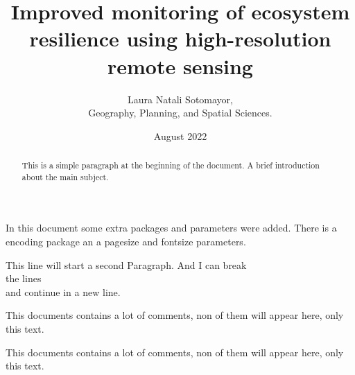 \documentclass[12pt, letterpaper, twoside]{article}
\title{Improved monitoring of ecosystem resilience using high-resolution remote sensing }
\author{Laura Natali Sotomayor, \\
Geography, Planning, and Spatial Sciences.}
\date{August 2022}
\begin{document}
\begin{titlepage}
\maketitle
\end{titlepage}

\begin{abstract}
This is a simple paragraph at the beginning of the 
document. A brief introduction about the main subject.
\end{abstract}

In this document some extra packages and parameters
were added. There is a encoding package
an a pagesize and fontsize parameters.

This line will start a second Paragraph. And I can break\\ the lines \\
and continue in a new line.

This documents contains a lot of comments, non of them
will appear here, only this text.

This documents contains a lot of comments, non of them
will appear here, only this text.

\begin{comment}
This text won't show up in the compiled pdf
this is just a multi-line comment. Useful
to, for instance, comment out slow-rendering
while working on the draft.
\end{comment}
\end{document}
